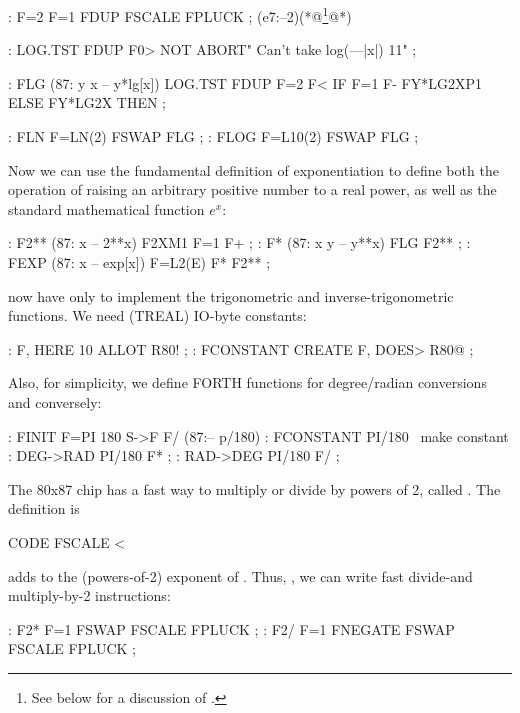 {{{{\begin{listing}
    : F=2 F=1 FDUP FSCALE FPLUCK ; (e7:--2)(*@\footnote{See below for a discussion of .}@*)

    : LOG.TST FDUP F0> NOT
       ABORT" Can't take log(—|x|) 11" ;

    : FLG (87: y x -- y*lg[x])
        LOG.TST  FDUP F=2 F<
        IF      F=1  F- FY*LG2XP1
        ELSE    FY*LG2X THEN ;

    : FLN   F=LN(2)     FSWAP FLG ;
    : FLOG  F=L10(2)    FSWAP FLG ;
\end{listing}

Now we can use the fundamental definition of exponentiation to define both the operation of raising an arbitrary positive number to a real power, as well as the standard mathematical function $e^x$:

\begin{listing}
    : F2**  (87: x   -- 2**x)   F2XM1 F=1 F+ ;
    : F*    (87: x y -- y**x)   FLG F2** ;
    : FEXP  (87: x   -- exp[x]) F=L2(E) F* F2** ;
\end{listing}

 now have only to implement the trigonometric and inverse-trigonometric functions. We need (TREAL) IO-byte constants:

\begin{listing}
    : F,        HERE    10 ALLOT R80! ;
    : FCONSTANT CREATE  F, DOES> R80@ ;
\end{listing}

Also, for simplicity, we define FORTH functions for degree/radian conversions and conversely:

\begin{listing}
    : FINIT     F=PI    180 S->F F/    (87:-- p/180)
    : FCONSTANT PI/180                \ make constant
    : DEG->RAD  PI/180 F* ;
    : RAD->DEG  PI/180 F/ ;
\end{listing}


The 80x87 chip has a fast way to multiply or divide by powers of 2, called . The  definition is

\begin{listing}
    CODE FSCALE <%
\end{listing}

 adds  to the (powers-of-2) exponent of . Thus, \eg, we can write fast divide-and multiply-by-2 instructions:

\begin{listing}
    : F2* F=1 FSWAP         FSCALE  FPLUCK ;
    : F2/ F=1 FNEGATE FSWAP FSCALE  FPLUCK ;
\end{listing}

}}}}
